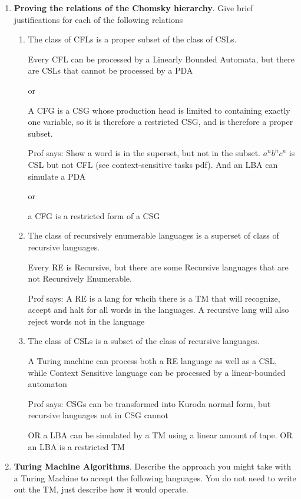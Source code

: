 \documentclass[12pt]{scrbook}
\begin{document}
\begin{enumerate}
  \item \textbf{Proving the relations of the Chomsky hierarchy}.  Give brief
    justifications for each of the following relations
    \begin{enumerate}
      \item The class of CFLs is a proper subset of the class of CSLs.

        Every CFL can be processed by a Linearly Bounded Automata,
        but there are CSLs that cannot be processed by a PDA

        or

        A CFG is a CSG whose production head is limited to containing exactly
        one variable, so it is therefore a restricted CSG, and is therefore a
        proper subset.

        Prof says:  Show a word is in the superset, but not in the subset.  $a^nb^nc^n$ is 
        CSL but not CFL (see context-sensitive tasks pdf).  And an LBA can simulate a PDA

        or

        a CFG is a restricted form of a CSG

      \item The class of recursively enumerable languages is a superset of class of recursive languages.

        Every RE is Recursive, but there are some Recursive languages that are
        not Recursively Enumerable.

        Prof says: A RE is a lang for whcih there is a TM that will recognize, accept and
        halt for all words in the languages.  A recursive lang will also reject
        words not in the language

      \item The class of CSLs is a subset of the class of recursive languages.

        A Turing machine can process both a RE language as well as a CSL, while
        Context Sensitive language can be processed by a linear-bounded automaton

        Prof says: CSGs can be transformed into Kuroda normal form, but recursive languages
        not in CSG cannot

        OR a LBA can be simulated by a TM using a linear amount of tape.
        OR an LBA is a restricted TM

    \end{enumerate}
  \item \textbf{Turing Machine Algorithms}.  Describe the approach you might take with a
    Turing Machine to accept the following languages. You do not need to
    write out the TM, just describe how it would operate.


\end{enumerate}
\end{document}
